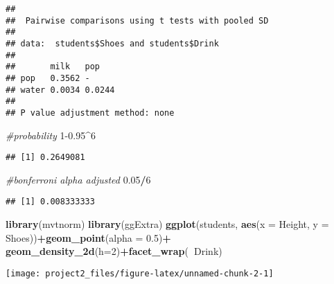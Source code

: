 \documentclass[]{article}
\newenvironment{Shaded}{\begin{snugshade}}{\end{snugshade}}
\newcommand{\CommentTok}[1]{\textcolor[rgb]{0.56,0.35,0.01}{\textit{#1}}}
\newcommand{\ControlFlowTok}[1]{\textcolor[rgb]{0.13,0.29,0.53}{\textbf{#1}}}
\newcommand{\DataTypeTok}[1]{\textcolor[rgb]{0.13,0.29,0.53}{#1}}
\newcommand{\DecValTok}[1]{\textcolor[rgb]{0.00,0.00,0.81}{#1}}
\newcommand{\FloatTok}[1]{\textcolor[rgb]{0.00,0.00,0.81}{#1}}
\newcommand{\KeywordTok}[1]{\textcolor[rgb]{0.13,0.29,0.53}{\textbf{#1}}}
\newcommand{\NormalTok}[1]{#1}
\newcommand{\OperatorTok}[1]{\textcolor[rgb]{0.81,0.36,0.00}{\textbf{#1}}}
\newcommand{\StringTok}[1]{\textcolor[rgb]{0.31,0.60,0.02}{#1}}
\begin{document}
\begin{verbatim}
## 
##  Pairwise comparisons using t tests with pooled SD 
## 
## data:  students$Shoes and students$Drink 
## 
##       milk   pop   
## pop   0.3562 -     
## water 0.0034 0.0244
## 
## P value adjustment method: none
\end{verbatim}

\begin{Shaded}
\begin{Highlighting}[]
\CommentTok{#probability}
\DecValTok{1}\FloatTok{-0.95}\OperatorTok{^}\DecValTok{6}
\end{Highlighting}
\end{Shaded}

\begin{verbatim}
## [1] 0.2649081
\end{verbatim}

\begin{Shaded}
\begin{Highlighting}[]
\CommentTok{#bonferroni alpha adjusted}
\FloatTok{0.05}\OperatorTok{/}\DecValTok{6}
\end{Highlighting}
\end{Shaded}

\begin{verbatim}
## [1] 0.008333333
\end{verbatim}

\begin{Shaded}
\begin{Highlighting}[]
\KeywordTok{library}\NormalTok{(mvtnorm)}
\KeywordTok{library}\NormalTok{(ggExtra)}
\KeywordTok{ggplot}\NormalTok{(students, }\KeywordTok{aes}\NormalTok{(}\DataTypeTok{x =}\NormalTok{ Height, }\DataTypeTok{y =}\NormalTok{ Shoes))}\OperatorTok{+}\KeywordTok{geom_point}\NormalTok{(}\DataTypeTok{alpha =} \FloatTok{0.5}\NormalTok{)}\OperatorTok{+}\StringTok{  }
\StringTok{  }\KeywordTok{geom_density_2d}\NormalTok{(}\DataTypeTok{h=}\DecValTok{2}\NormalTok{)}\OperatorTok{+}\KeywordTok{facet_wrap}\NormalTok{(}\OperatorTok{~}\NormalTok{Drink)}
\end{Highlighting}
\end{Shaded}

\begin{center}\texttt{[image: project2\_files/figure-latex/unnamed-chunk-2-1]} \end{center}

\begin{Shaded}
\end{Shaded}
\end{document}
